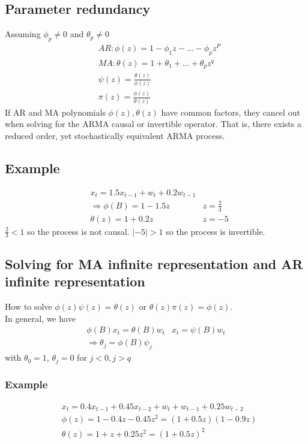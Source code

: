     

\subsection{Parameter redundancy}
Assuming $\phi_p \neq 0$ and $\theta_p \neq 0$
    \begin{align*}
        & AR: \phi(z) = 1 - \phi_1 z - ... - \phi_p z^P \\
        & MA: \theta(z) = 1 + \theta_1 + ... + \theta_p z^q \\
        & \psi(z) = \frac{\theta(z)}{\phi(z)}\\
        & \pi(z) = \frac{\phi(z)}{\theta(z)}
    \end{align*}
If AR and MA polynomials $\phi(z), \theta(z)$ have common factors, they cancel out when solving for the ARMA causal or invertible operator. That is, there exists a reduced order, yet stochastically equivalent ARMA process. 


\subsection{Example} 
    \begin{align*}
        & x_t = 1.5 x_{t-1} + w_t + 0.2 w_{t-1}\\
        & \Longrightarrow \phi(B) = 1 - 1.5z & z = \frac{2}{3}\\
        & \theta(z) = 1 + 0.2z & z = -5
    \end{align*}
$\frac{2}{3} < 1$ so the process is not causal. $|-5|>1$ so the process is invertible. 


\subsection{Solving for MA infinite representation and AR infinite representation} 
How to solve $\phi(z)\psi(z) = \theta(z)$ or $\theta(z)\pi(z) = \phi(z)$. \\

In general, we have 
    \begin{align*}
        \phi(B)x_t = \theta(B)w_t & x_t = \psi(B)w_t \\
        \Longrightarrow \theta_j = \phi(B)\psi_j
    \end{align*}
with $\theta_0 = 1$, $\theta_j = 0$ for $j < 0, j > q$

\subsubsection{Example}
    \begin{align*}
        & x_t = 0.4x_{t-1} + 0.45x_{t-2} + w_t + w_{t-1} + 0.25w_{t-2}\\
        & \phi(z) = 1 - 0.4z - 0.45z^2 =(1 + 0.5z)(1-0.9z)\\
        & \theta(z) = 1 + z + 0.25z^2 = (1 + 0.5z)^2\\
    \end{align*}
    
